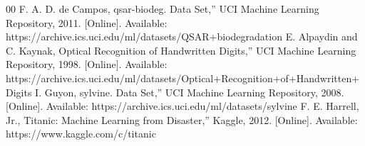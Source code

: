 \documentclass[conference]{IEEEtran}
\begin{document}
\begin{thebibliography}{00}
 F. A. D. de Campos, \texttt{}qsar-biodeg. Data Set,'' UCI Machine Learning Repository, 2011. [Online]. Available: https://archive.ics.uci.edu/ml/datasets/QSAR+biodegradation
 E. Alpaydin and C. Kaynak, \texttt{}Optical Recognition of Handwritten Digits,'' UCI Machine Learning Repository, 1998. [Online]. Available: https://archive.ics.uci.edu/ml/datasets/Optical+Recognition+of+Handwritten+Digits
 I. Guyon, \texttt{}sylvine. Data Set,'' UCI Machine Learning Repository, 2008. [Online]. Available: https://archive.ics.uci.edu/ml/datasets/sylvine
 F. E. Harrell, Jr., \texttt{}Titanic: Machine Learning from Disaster,'' Kaggle, 2012. [Online]. Available: https://www.kaggle.com/c/titanic

\end{thebibliography}
\end{document}
